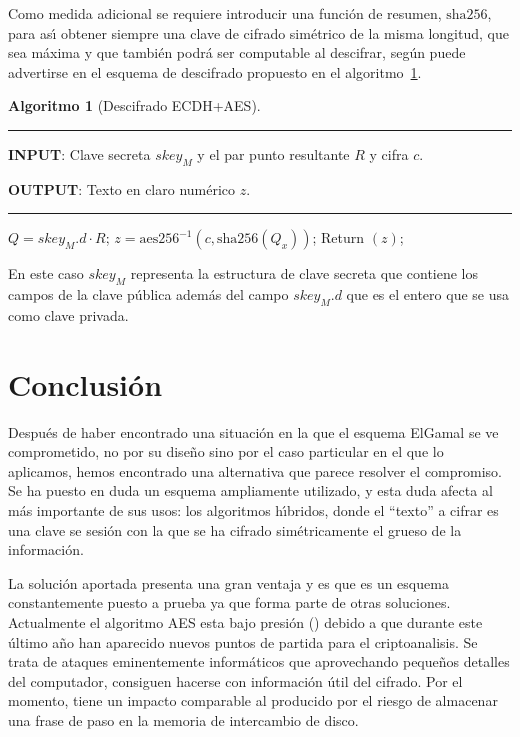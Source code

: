 \documentclass{llncs}
\theoremstyle{plain}        			%
\theoremstyle{definition}   			%
\theoremstyle{saltolinea}   			%
\newtheorem{algo}{Algoritmo}
\begin{document}
Como medida adicional se requiere introducir una funci\'on de resumen, $\textrm{sha256}$, para as\'{\i} obtener siempre una clave de cifrado sim\'etrico de la misma longitud, que sea m\'axima y que tambi\'en podr\'a ser computable al descifrar, seg\'un puede advertirse en el esquema de descifrado propuesto en el algoritmo~\ref{alg:descifrado}.

\begin{algo}[Descifrado ECDH+AES]\label{alg:descifrado}
\parbox[b]{\linewidth}{%
\hrule
\smallskip
{\bf INPUT}: Clave secreta $skey_{M}$ y el par punto resultante $R$ y cifra $c$.

{\bf OUTPUT}: Texto en claro num\'erico $z$.
\vspace{1.5mm}
\hrule
}%
\begin{algorithmic}[1]
\STATE $Q=skey_{M}.d\cdot R$;
\STATE $z=\textrm{aes256}^{-1}(c,\textrm{sha256}(Q_x))$;
\STATE Return $(z)$;
\end{algorithmic}
\end{algo}

En este caso $skey_{M}$ representa la estructura de clave secreta que contiene los campos de la clave p\'ublica adem\'as del campo $skey_{M}.d$ que es el entero que se usa como clave privada.

\section{Conclusi\'on}

Despu\'es de haber encontrado una situaci\'on en la que el esquema ElGamal se ve comprometido, no por su dise\~no sino por el caso particular en el que lo aplicamos, hemos encontrado una alternativa que parece resolver el compromiso. Se ha puesto en duda un esquema ampliamente utilizado, y esta duda afecta al m\'as importante de sus usos: los algoritmos h\'{\i}bridos, donde el ``texto'' a cifrar es una clave se sesi\'on con la que se ha cifrado sim\'etricamente el grueso de la informaci\'on.

La soluci\'on aportada presenta una gran ventaja y es que es un esquema constantemente puesto a prueba ya que forma parte de otras soluciones. Actualmente el algoritmo AES esta bajo presi\'on (\cite{OHT05,BERN05}) debido a que durante este \'ultimo a\~no han aparecido nuevos puntos de partida para el criptoanalisis. Se trata de ataques eminentemente inform\'aticos que aprovechando peque\~nos detalles del computador, consiguen hacerse con informaci\'on \'util del cifrado. Por el momento, tiene un impacto comparable al producido por el riesgo de almacenar una frase de paso en la memoria de intercambio de disco.
\end{document}
